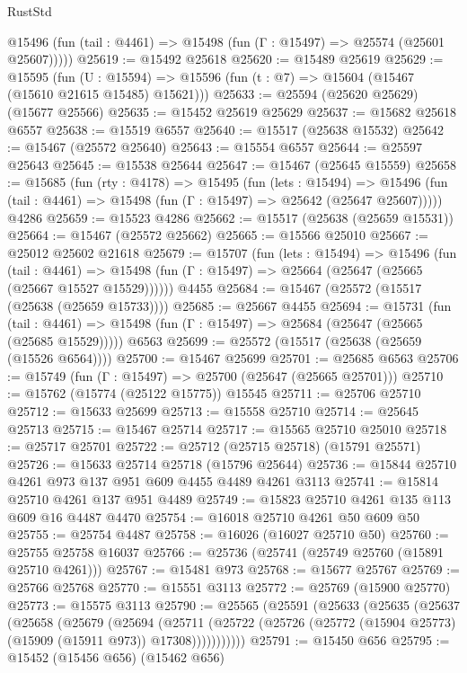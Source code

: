 \begin{lexlean}{RustStd}
\begin{coremodule}
      @15496 (fun (tail : @4461) => @15498 (fun (Γ : @15497) => @25574 (@25601 @25607)))))
@25619 := @15492 @25618
@25620 := @15489 @25619
@25629 := @15595
    (fun (U : @15594) => @15596 (fun (t : @7) => @15604 (@15467 (@15610 @21615 @15485) @15621)))
@25633 := @25594 (@25620 @25629) (@15677 @25566)
@25635 := @15452 @25619 @25629
@25637 := @15682 @25618 @6557
@25638 := @15519 @6557
@25640 := @15517 (@25638 @15532)
@25642 := @15467 (@25572 @25640)
@25643 := @15554 @6557
@25644 := @25597 @25643
@25645 := @15538 @25644
@25647 := @15467 (@25645 @15559)
@25658 := @15685
    (fun (rty : @4178) =>
    @15495
      (fun (lets : @15494) =>
      @15496 (fun (tail : @4461) => @15498 (fun (Γ : @15497) => @25642 (@25647 @25607)))))
    @4286
@25659 := @15523 @4286
@25662 := @15517 (@25638 (@25659 @15531))
@25664 := @15467 (@25572 @25662)
@25665 := @15566 @25010
@25667 := @25012 @25602 @21618
@25679 := @15707
    (fun (lets : @15494) =>
    @15496
      (fun (tail : @4461) =>
      @15498 (fun (Γ : @15497) => @25664 (@25647 (@25665 (@25667 @15527 @15529))))))
    @4455
@25684 := @15467 (@25572 (@15517 (@25638 (@25659 @15733))))
@25685 := @25667 @4455
@25694 := @15731
    (fun (tail : @4461) => @15498 (fun (Γ : @15497) => @25684 (@25647 (@25665 (@25685 @15529)))))
    @6563
@25699 := @25572 (@15517 (@25638 (@25659 (@15526 @6564))))
@25700 := @15467 @25699
@25701 := @25685 @6563
@25706 := @15749 (fun (Γ : @15497) => @25700 (@25647 (@25665 @25701)))
@25710 := @15762 (@15774 (@25122 @15775)) @15545
@25711 := @25706 @25710
@25712 := @15633 @25699
@25713 := @15558 @25710
@25714 := @25645 @25713
@25715 := @15467 @25714
@25717 := @15565 @25710 @25010
@25718 := @25717 @25701
@25722 := @25712 (@25715 @25718) (@15791 @25571)
@25726 := @15633 @25714 @25718 (@15796 @25644)
@25736 := @15844 @25710 @4261 @973 @137 @951 @609 @4455 @4489 @4261 @3113
@25741 := @15814 @25710 @4261 @137 @951 @4489
@25749 := @15823 @25710 @4261 @135 @113 @609 @16 @4487 @4470
@25754 := @16018 @25710 @4261 @50 @609 @50
@25755 := @25754 @4487
@25758 := @16026 (@16027 @25710 @50)
@25760 := @25755 @25758 @16037
@25766 := @25736 (@25741 (@25749 @25760 (@15891 @25710 @4261)))
@25767 := @15481 @973
@25768 := @15677 @25767
@25769 := @25766 @25768
@25770 := @15551 @3113
@25772 := @25769 (@15900 @25770)
@25773 := @15575 @3113
@25790 := @25565
    (@25591
      (@25633
        (@25635
          (@25637
            (@25658
              (@25679
                (@25694
                  (@25711
                    (@25722 (@25726 (@25772 (@15904 @25773) (@15909 (@15911 @973)) @17308)))))))))))
@25791 := @15450 @656
@25795 := @15452 (@15456 @656) (@15462 @656)

\end{coremodule}
\end{lexlean}
